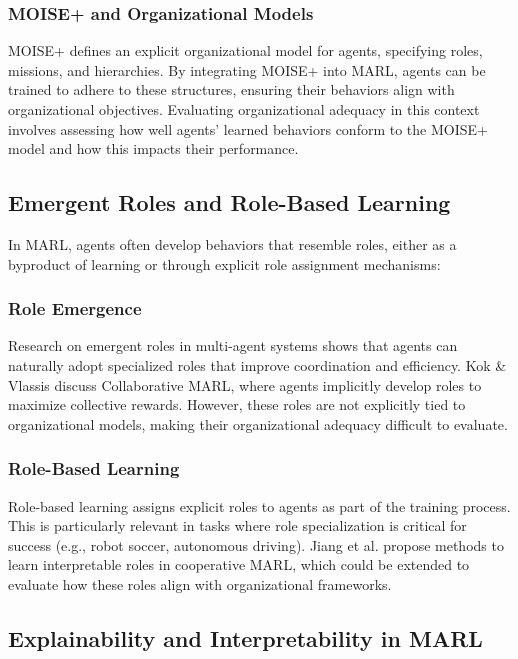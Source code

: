 \documentclass[sigconf,anonymous]{aamas}
\begin{document}
\subsubsection{MOISE+ and Organizational Models}
MOISE+ \cite{hubner2007moise} defines an explicit organizational model for agents, specifying roles, missions, and hierarchies. By integrating MOISE+ into MARL, agents can be trained to adhere to these structures, ensuring their behaviors align with organizational objectives. Evaluating organizational adequacy in this context involves assessing how well agents' learned behaviors conform to the MOISE+ model and how this impacts their performance.

\subsection{Emergent Roles and Role-Based Learning}

In MARL, agents often develop behaviors that resemble roles, either as a byproduct of learning or through explicit role assignment mechanisms:

\subsubsection{Role Emergence}
Research on emergent roles in multi-agent systems shows that agents can naturally adopt specialized roles that improve coordination and efficiency. Kok \& Vlassis \cite{kok2006collaborative} discuss Collaborative MARL, where agents implicitly develop roles to maximize collective rewards. However, these roles are not explicitly tied to organizational models, making their organizational adequacy difficult to evaluate.

\subsubsection{Role-Based Learning}
Role-based learning assigns explicit roles to agents as part of the training process. This is particularly relevant in tasks where role specialization is critical for success (e.g., robot soccer, autonomous driving). Jiang et al. \cite{jiang2021interpretable} propose methods to learn interpretable roles in cooperative MARL, which could be extended to evaluate how these roles align with organizational frameworks.

\subsection{Explainability and Interpretability in MARL}
\end{document}
